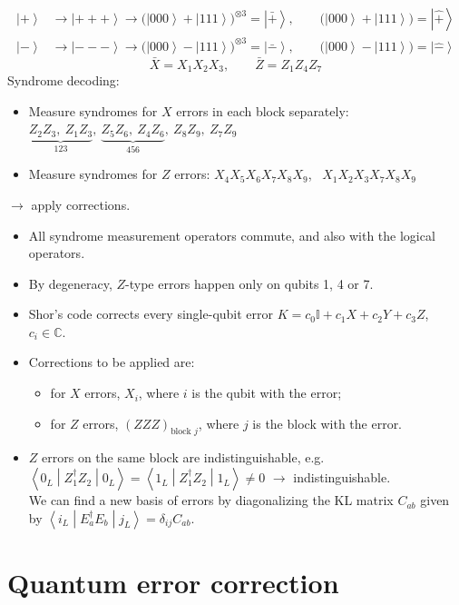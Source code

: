 \documentclass[11pt,a4paper]{article}
\renewcommand{\ket}[1]{\left|#1\right\rangle}
\newcommand{\expval}[3]{\left\langle#1\middle|#2\middle|#3\right\rangle}
\newcommand{\CC}{\mathbb{C}}
\newcommand{\id}{\mathbb{I}}
\begin{document}
\begin{align*}
\ket+ &\to \ket{+++} \to \bigl(\ket{000}+\ket{111}\bigr)^{\otimes3} = \ket{\bar+}, \qquad \bigl(\ket{000}+\ket{111}\bigr) = \ket{\hat+}\\
\ket- &\to \ket{---} \to \bigl(\ket{000}-\ket{111}\bigr)^{\otimes3} = \ket{\bar-}, \qquad \bigl(\ket{000}-\ket{111}\bigr) = \ket{\hat-}
\end{align*}
\[
\bar X = X_1X_2X_3,\qquad \bar Z = Z_1Z_4Z_7
\]
Syndrome decoding:
\begin{itemize}[label=--]
  \item Measure syndromes for $X$ errors in each block separately: $\underbrace{Z_2Z_3,\ Z_1Z_3}_{123},\ \underbrace{Z_5Z_6,\ Z_4Z_6}_{456},\ Z_8Z_9,\ Z_7Z_9$
  \item Measure syndromes for $Z$ errors: $X_4X_5X_6X_7X_8X_9$, \ $X_1X_2X_3X_7X_8X_9$
\end{itemize}
$\to$ apply corrections.
\begin{itemize}
  \item All syndrome measurement operators commute, and also with the logical operators.
  \item By degeneracy, $Z$-type errors happen only on qubits 1, 4 or 7.
  \item Shor's code corrects every single-qubit error $K = c_0\id + c_1X + c_2Y + c_3Z$, $c_i\in\CC$.
  \item Corrections to be applied are:
  \begin{itemize}[label=$\to$]
    \item for $X$ errors, $X_i$, where $i$ is the qubit with the error;
    \item for $Z$ errors, $(ZZZ)_{\text{block }j}$, where $j$ is the block with the error.
  \end{itemize}
  \item $Z$ errors on the same block are indistinguishable, e.g.\ $\expval{0_L}{Z_1^\dagger Z_2}{0_L} = \expval{1_L}{Z_1^\dagger Z_2}{1_L}\neq0$ $\to$ indistinguishable.\\
  We can find a new basis of errors by diagonalizing the KL matrix $C_{ab}$ given by $\expval{i_L}{E_a^\dagger E_b}{j_L} = \delta_{ij}C_{ab}$.
\end{itemize}

\section{Quantum error correction}
\end{document}
